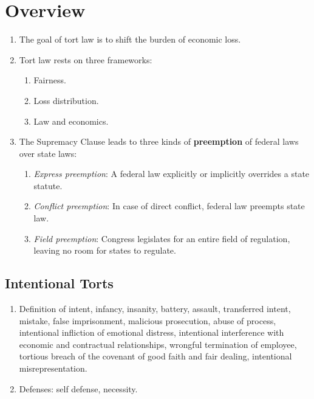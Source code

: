 \section{Overview}

\begin{enumerate}
    \item The goal of tort law is to shift the burden of economic loss.
    \item Tort law rests on three frameworks:
    \begin{enumerate}
        \item Fairness.
        \item Loss distribution.
        \item Law and economics.
    \end{enumerate}
    \item The Supremacy Clause leads to three kinds of 
    \textbf{preemption} of federal laws over state laws:
    \begin{enumerate}
        \item \emph{Express preemption}: A federal law explicitly or 
        implicitly overrides a state statute.
        \item \emph{Conflict preemption}: In case of direct conflict, 
        federal law preempts state law.
        \item \emph{Field preemption}: Congress legislates for an entire 
        field of regulation, leaving no room for states to regulate.
    \end{enumerate}
\end{enumerate}

\subsection{Intentional Torts}

\begin{enumerate}
    \item Definition of intent, infancy, insanity, battery, assault, 
    transferred intent, mistake, false imprisonment, malicious prosecution, 
    abuse of process, intentional infliction of emotional distress, 
    intentional interference with economic and contractual relationships, 
    wrongful termination of employee, tortious breach of the covenant of good 
    faith and fair dealing, intentional misrepresentation.
    \item Defenses: self defense, necessity.
\end{enumerate}

